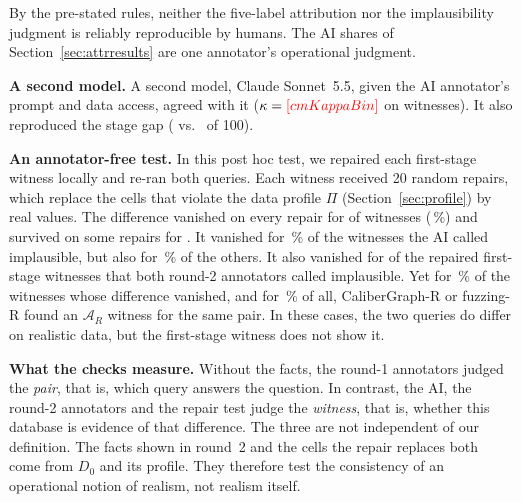 By the pre-stated rules, neither the five-label attribution nor the implausibility judgment is reliably reproducible by humans. The AI shares of Section~\ref{sec:attrresults} are one annotator's operational judgment.

\textbf{A second model.} A second model, Claude Sonnet~5.5, given the AI annotator's prompt and data access, agreed with it ($\kappa=\V{cmKappaBin}$ on  witnesses). It also reproduced the stage gap ( vs.\  of 100).

\textbf{An annotator-free test.} In this post hoc test, we repaired each first-stage witness locally and re-ran both queries. Each witness received 20 random repairs, which replace the cells that violate the data profile $\Pi$ (Section~\ref{sec:profile}) by real values. The difference vanished on every repair for  of  witnesses (\,\%) and survived on some repairs for . It vanished for \,\% of the witnesses the AI called implausible, but also for \,\% of the others. It also vanished for  of the  repaired first-stage witnesses that both round-2 annotators called implausible. Yet for \,\% of the witnesses whose difference vanished, and for \,\% of all, CaliberGraph-R or fuzzing-R found an $\mathcal A_R$ witness for the same pair. In these cases, the two queries do differ on realistic data, but the first-stage witness does not show it.

\textbf{What the checks measure.} Without the facts, the round-1 annotators judged the \emph{pair}, that is, which query answers the question. In contrast, the AI, the round-2 annotators and the repair test judge the \emph{witness}, that is, whether this database is evidence of that difference. The three are not independent of our definition. The facts shown in round~2 and the cells the repair replaces both come from $D_0$ and its profile. They therefore test the consistency of an operational notion of realism, not realism itself.
